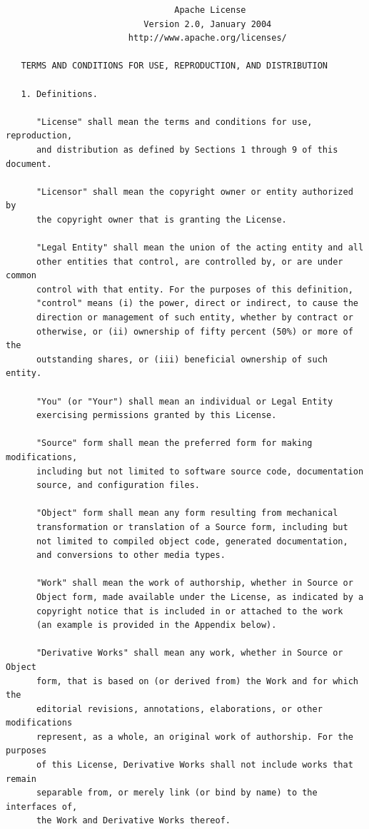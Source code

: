 \begin{verbatim}
                                 Apache License
                           Version 2.0, January 2004
                        http://www.apache.org/licenses/

   TERMS AND CONDITIONS FOR USE, REPRODUCTION, AND DISTRIBUTION

   1. Definitions.

      "License" shall mean the terms and conditions for use, reproduction,
      and distribution as defined by Sections 1 through 9 of this document.

      "Licensor" shall mean the copyright owner or entity authorized by
      the copyright owner that is granting the License.

      "Legal Entity" shall mean the union of the acting entity and all
      other entities that control, are controlled by, or are under common
      control with that entity. For the purposes of this definition,
      "control" means (i) the power, direct or indirect, to cause the
      direction or management of such entity, whether by contract or
      otherwise, or (ii) ownership of fifty percent (50%) or more of the
      outstanding shares, or (iii) beneficial ownership of such entity.

      "You" (or "Your") shall mean an individual or Legal Entity
      exercising permissions granted by this License.

      "Source" form shall mean the preferred form for making modifications,
      including but not limited to software source code, documentation
      source, and configuration files.

      "Object" form shall mean any form resulting from mechanical
      transformation or translation of a Source form, including but
      not limited to compiled object code, generated documentation,
      and conversions to other media types.

      "Work" shall mean the work of authorship, whether in Source or
      Object form, made available under the License, as indicated by a
      copyright notice that is included in or attached to the work
      (an example is provided in the Appendix below).

      "Derivative Works" shall mean any work, whether in Source or Object
      form, that is based on (or derived from) the Work and for which the
      editorial revisions, annotations, elaborations, or other modifications
      represent, as a whole, an original work of authorship. For the purposes
      of this License, Derivative Works shall not include works that remain
      separable from, or merely link (or bind by name) to the interfaces of,
      the Work and Derivative Works thereof.


\end{verbatim}
